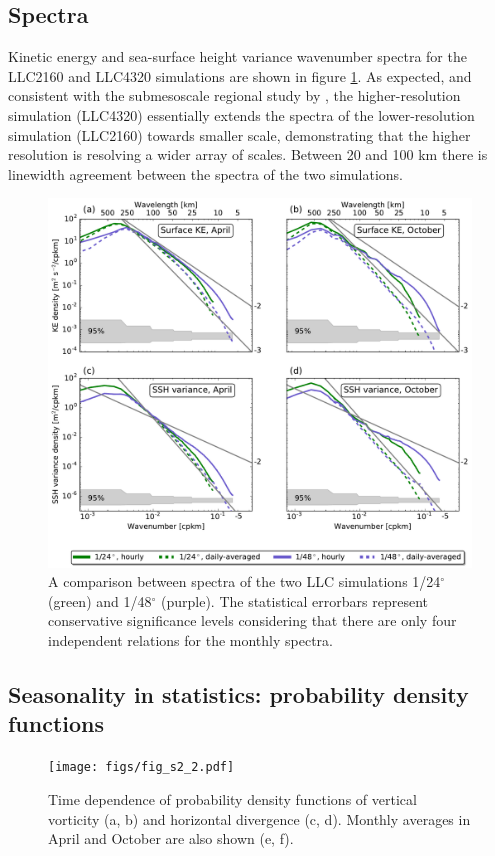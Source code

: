 \documentclass[grl]{agutex2015}
\begin{document}
\begin{article}
\subsection*{Spectra}
Kinetic energy and sea-surface height variance wavenumber spectra for the LLC2160
and LLC4320 simulations are shown in figure \ref{figS2_3}. As expected, and
consistent with the submesoscale regional study by \cite{capet_etal2008a}, the
higher-resolution simulation (LLC4320) essentially extends the spectra of the
lower-resolution simulation (LLC2160) towards smaller scale, demonstrating that
the higher resolution is resolving a wider array of scales. Between 20 and 100 km
there is linewidth agreement between the spectra of the two simulations.


\begin{figure}[ht]
   \begin{center}
     \includegraphics[width=1.\textwidth]{figs/fig_s2_3.pdf}
  \caption{A comparison between spectra of the two LLC simulations 1/24$^\circ$
  (green) and 1/48$^\circ$ (purple). The statistical errorbars represent conservative
  significance levels considering that there are only four independent relations
  for the monthly spectra.}
  \label{figS2_3}
  \end{center}
\end{figure}

\subsection*{Seasonality in statistics: probability density functions}
\begin{figure}[ht]
   \begin{center}
     \texttt{[image: figs/fig\_s2\_2.pdf]}
  \caption{Time dependence of probability density functions of vertical vorticity (a, b)
  and horizontal divergence (c, d). Monthly averages in April and October are
  also shown (e, f).}
  \label{figS2_2}
  \end{center}
\end{figure}


\end{article}
\end{document}
